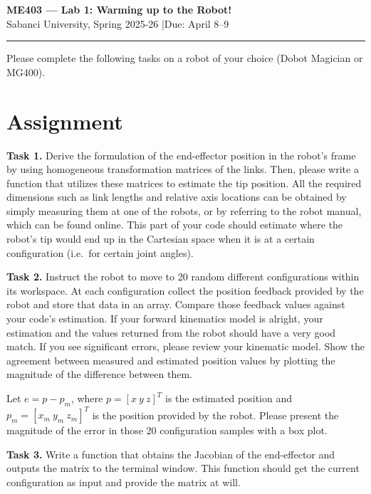 \documentclass[11pt,a4paper]{article}
\begin{document}
\begin{center}
  {\Large\bfseries ME403 --- Lab 1: Warming up to the Robot!}\\[4pt]
  {\normalsize Sabanci University, Spring 2025-26 \quad|\quad Due: April 8--9}
\end{center}

\rule{\linewidth}{0.8pt}

Please complete the following tasks on a robot of your choice (Dobot Magician or MG400).

\section*{Assignment}

\textbf{Task 1.} Derive the formulation of the end-effector position in the robot's frame by
using homogeneous transformation matrices of the links. Then, please write a function that
utilizes these matrices to estimate the tip position. All the required dimensions such as link
lengths and relative axis locations can be obtained by simply measuring them at one of the
robots, or by referring to the robot manual, which can be found online. This part of your code
should estimate where the robot's tip would end up in the Cartesian space when it is at a
certain configuration (i.e.\ for certain joint angles).

\textbf{Task 2.} Instruct the robot to move to 20 random different configurations within its
workspace. At each configuration collect the position feedback provided by the robot and store
that data in an array. Compare those feedback values against your code's estimation. If your
forward kinematics model is alright, your estimation and the values returned from the robot
should have a very good match. If you see significant errors, please review your kinematic
model. Show the agreement between measured and estimated position values by plotting the
magnitude of the difference between them.

Let $e = p - p_m$, where $p = [x\ y\ z]^T$ is the estimated position and
$p_m = [x_m\ y_m\ z_m]^T$ is the position provided by the robot. Please present the magnitude
of the error in those 20 configuration samples with a box plot.

\textbf{Task 3.} Write a function that obtains the Jacobian of the end-effector and outputs the
matrix to the terminal window. This function should get the current configuration as input and
provide the matrix at will.
\end{document}
